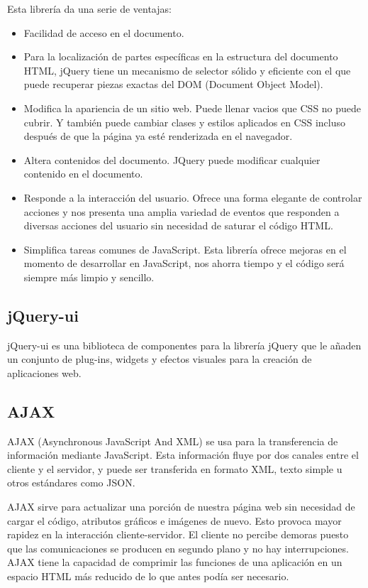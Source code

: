 \documentclass[a4paper, 12pt]{book}
\begin{document}
Esta librer\'ia da una serie de ventajas: 
\begin{itemize}
  \item Facilidad de acceso en el documento.
  \item Para la localizaci\'on de partes espec\'ificas en la estructura del documento HTML, jQuery tiene un mecanismo de selector s\'olido y 
eficiente con el que puede recuperar piezas exactas del DOM (Document Object Model).
  \item Modifica la apariencia de un sitio web. Puede llenar vacios que CSS no puede cubrir. Y tambi\'en puede cambiar clases y estilos aplicados 
en CSS incluso despu\'es de que la p\'agina ya est\'e renderizada en el navegador.
  \item Altera contenidos del documento. JQuery puede modificar cualquier contenido en el documento.
  \item Responde a la interacci\'on del usuario. Ofrece una forma elegante de controlar acciones y nos presenta una amplia variedad de eventos 
que responden a diversas acciones del usuario sin necesidad de saturar el c\'odigo HTML.
  \item Simplifica tareas comunes de JavaScript. Esta librer\'ia ofrece mejoras en el momento de desarrollar en JavaScript, nos ahorra tiempo 
y el c\'odigo ser\'a siempre m\'as limpio y sencillo.
\end{itemize}


\subsection{jQuery-ui}
\label{subsec:jqueryui}
jQuery-ui es una biblioteca de componentes para la librer\'ia jQuery que le a\~naden un conjunto de plug-ins, widgets y efectos visuales para la 
creaci\'on de aplicaciones web.


\subsection{AJAX}
\label{subsec:ajax}
AJAX (Asynchronous JavaScript And XML) se usa para la transferencia de informaci\'on mediante JavaScript. Esta informaci\'on fluye por dos canales 
entre el cliente y el servidor, y puede ser transferida en formato XML, texto simple u otros est\'andares como JSON.

AJAX sirve para actualizar una porci\'on de nuestra p\'agina web sin necesidad de cargar el c\'odigo, atributos gr\'aficos e im\'agenes de nuevo. Esto
provoca mayor rapidez en la interacci\'on cliente-servidor. El cliente no percibe demoras puesto que las comunicaciones se producen en segundo plano y
no hay interrupciones. AJAX tiene la capacidad de comprimir las funciones de una aplicaci\'on en un espacio HTML m\'as reducido de lo que antes pod\'ia
ser necesario.
\end{document}
